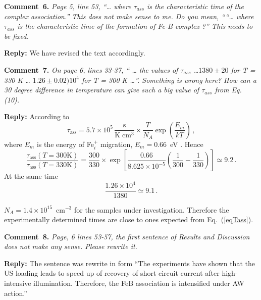 \documentclass[sn-mathphys]{sn-jnl}
\begin{document}
\vspace{1cm}
\noindent
\textcolor[rgb]{0.00,0.50,1.00}{\textbf{Comment~6.}}
\emph{Page 5, line 53, “… where $\tau_{ass}$ is the characteristic time of the complex association.”
This does not make sense to me.
Do you mean, ““… where $\tau_{ass}$ is the characteristic time of the formation of Fe-B complex ?” This needs to be fixed.}

\noindent
\textcolor[rgb]{0.51,0.00,0.00}{\textbf{Reply:}}
We have revised the text accordingly.


\vspace{1cm}
\noindent
\textcolor[rgb]{0.00,0.50,1.00}{\textbf{Comment~7.}}
\emph{On page 6, lines 33-37, “ … the values of $\tau_{ass}$ …$1380 \pm20$  for T = 330 K … $1.26 \pm0.02) 10^4$  for T = 300 K …”.
Something is wrong here?
How can a 30 degree difference in temperature can give such a big value of $\tau_{ass}$ from Eq. (10).}

\noindent
\textcolor[rgb]{0.51,0.00,0.00}{\textbf{Reply:}}
According to \cite{FeBKin2019,FeBAssJAP2014,FeBAssSST2011}
\begin{equation}
\label{eqTass}
\tau_\mathrm{ass}=5.7\times10^5\,\frac{\mathrm{s}}{\mathrm{K}\;\mathrm{cm}^3}\times\frac{T}{N_A}\exp\left(\frac{E_m}{kT}\right)\,,
\end{equation}
where
$E_m$ is the energy of Fe$_i^+$ migration, $E_m=0.66$~eV \cite{FeBAssJAP2014,FeBkinAPL2008,FeBKin2019,FeBAssSST2011}.
Hence
\begin{equation}
\frac{\tau_\mathrm{ass}(T=300 \mathrm{K})}{\tau_\mathrm{ass}(T=330 \mathrm{K})}=
\frac{300}{330}\times \exp\left[\frac{0.66}{8.625\times10^{-5}}\left(\frac{1}{300}-\frac{1}{330}\right)\right]\simeq9.2\,.
\end{equation}
At the same time
\begin{equation}
\frac{1.26\times10^4}{1380}\simeq9.1\,.
\end{equation}

$N_A=1.4\times10^{15}$~cm$^{-3}$ for the samples under investigation.
Therefore the experimentally determined times are close to ones expected from Eq.~(\ref{eqTass}).




\vspace{1cm}
\noindent
\textcolor[rgb]{0.00,0.50,1.00}{\textbf{Comment~8.}}
\emph{Page, 6 lines 53-57, the first sentence of Results and Discussion does not make any sense.
Please rewrite it.}

\noindent
\textcolor[rgb]{0.51,0.00,0.00}{\textbf{Reply:}}
The sentence was rewrite in form
``The experiments have shown that the US loading leads to 
speed up of recovery of short circuit current after high-intensive illumination.
Therefore, the  FeB association is intensified under AW action.''
\end{document}
